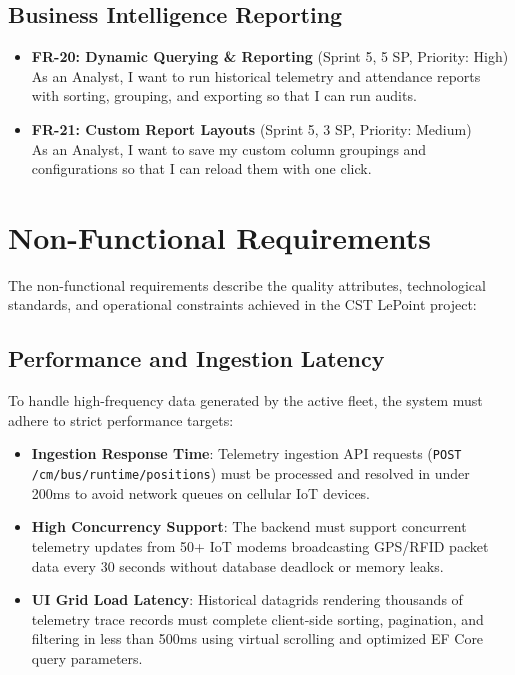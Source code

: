 \subsection{Business Intelligence Reporting}
\begin{itemize}
  \item \textbf{FR-20: Dynamic Querying \& Reporting} (Sprint 5, 5 SP, Priority: High) \\
  As an Analyst, I want to run historical telemetry and attendance reports with sorting, grouping, and exporting so that I can run audits.
  \item \textbf{FR-21: Custom Report Layouts} (Sprint 5, 3 SP, Priority: Medium) \\
  As an Analyst, I want to save my custom column groupings and configurations so that I can reload them with one click.
\end{itemize}

\section{Non-Functional Requirements}

The non-functional requirements describe the quality attributes, technological standards, and operational constraints achieved in the CST LePoint project:

\subsection{Performance and Ingestion Latency}
To handle high-frequency data generated by the active fleet, the system must adhere to strict performance targets:
\begin{itemize}
  \item \textbf{Ingestion Response Time}: Telemetry ingestion API requests (\texttt{POST /cm/bus/runtime/positions}) must be processed and resolved in under 200ms to avoid network queues on cellular IoT devices.
  \item \textbf{High Concurrency Support}: The backend must support concurrent telemetry updates from 50+ IoT modems broadcasting GPS/RFID packet data every 30 seconds without database deadlock or memory leaks.
  \item \textbf{UI Grid Load Latency}: Historical datagrids rendering thousands of telemetry trace records must complete client-side sorting, pagination, and filtering in less than 500ms using virtual scrolling and optimized EF Core query parameters.
\end{itemize}

